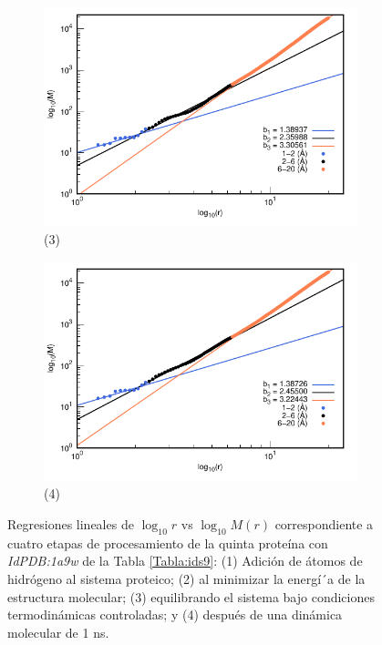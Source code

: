 \begin{figure}[H]
	\vspace{0cm} %
	
	\hspace{-0.3cm} 
	\begin{subfigure}{0.49\textwidth}
		\centering
		\includegraphics[width=\linewidth,page=1]{graphs/PDBs/1a9w/1a9wEq.pdf}
		\caption{(3)}
	\end{subfigure}
	\hspace{0.2cm}
	\begin{subfigure}{0.49\textwidth} %
		\centering
		\includegraphics[width=\linewidth,page=1]{graphs/PDBs/1a9w/1a9w1ns.pdf}
		\caption{(4)}
	\end{subfigure}
	\caption{Regresiones lineales de $\log_{10}r$ vs $\log_{10}M(r)$ correspondiente a cuatro etapas de procesamiento de la quinta prote\'{i}na con \textit{IdPDB:1a9w} de la Tabla \ref{Tabla:ids9}: (1) Adici\'{o}n de \'{a}tomos de hidr\'{o}geno al sistema proteico; (2) al minimizar la energ\'{i´}a de la estructura molecular; (3) equilibrando el sistema bajo condiciones termodin\'{a}micas controladas; y (4) despu\'{e}s de una din\'{a}mica molecular de 1 ns.}
	\label{fig:1a9w}
\end{figure}


